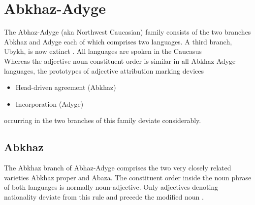\section{Abkhaz-Adyge}
The Abhaz-Adyge (aka Northwest Caucasian) family consists of the two branches Abkhaz and Adyge each of which comprises two languages. A third branch, Ubykh, is now extinct \citep[220, 233]{salminen2007}. All languages are spoken in the Caucasus\\

\noindent Whereas the adjective-noun constituent order is similar in all Abkhaz-Adyge languages, the prototypes of adjective attribution marking devices
\begin{itemize}
\item Head-driven agreement (Abkhaz)
\item Incorporation (Adyge)
\end{itemize}
occurring in the two branches of this family deviate considerably.

\subsection{Abkhaz}
The Abkhaz branch of Abhaz-Adyge comprises the two very closely related varieties Abkhaz proper and Abaza. The constituent order inside the noun phrase of both languages is normally noun-adjective. Only adjectives denoting nationality deviate from this rule and precede the modified noun \citep[222]{comrie1981}.

